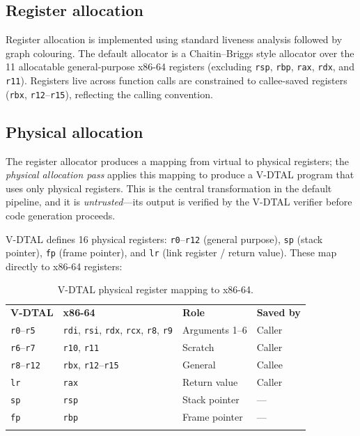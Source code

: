 \subsection{Register allocation}

Register allocation is implemented using standard liveness analysis followed by graph colouring. The default allocator is a Chaitin--Briggs style allocator over the 11 allocatable general-purpose x86-64 registers (excluding \texttt{rsp}, \texttt{rbp}, \texttt{rax}, \texttt{rdx}, and \texttt{r11}). Registers live across function calls are constrained to callee-saved registers (\texttt{rbx}, \texttt{r12}--\texttt{r15}), reflecting the calling convention. 

\subsection{Physical allocation}\label{sec:physalloc}

The register allocator produces a mapping from virtual to physical registers; the \textit{physical allocation pass} applies this mapping to produce a V-DTAL program that uses only physical registers. This is the central transformation in the default pipeline, and it is \textit{untrusted}---its output is verified by the V-DTAL verifier before code generation proceeds.

V-DTAL defines 16 physical registers: \texttt{r0}--\texttt{r12} (general purpose), \texttt{sp} (stack pointer), \texttt{fp} (frame pointer), and \texttt{lr} (link register / return value). These map directly to x86-64 registers:

\begin{table}[h]
\centering
\small
\begin{tabular}{l l l l}
\tablehline
\textbf{V-DTAL} & \textbf{x86-64} & \textbf{Role} & \textbf{Saved by} \\
\tablehline
\texttt{r0}--\texttt{r5} & \texttt{rdi}, \texttt{rsi}, \texttt{rdx}, \texttt{rcx}, \texttt{r8}, \texttt{r9} & Arguments 1--6 & Caller \\
\texttt{r6}--\texttt{r7} & \texttt{r10}, \texttt{r11} & Scratch & Caller \\
\texttt{r8}--\texttt{r12} & \texttt{rbx}, \texttt{r12}--\texttt{r15} & General & Callee \\
\texttt{lr} & \texttt{rax} & Return value & Caller \\
\texttt{sp} & \texttt{rsp} & Stack pointer & --- \\
\texttt{fp} & \texttt{rbp} & Frame pointer & --- \\
\tablehline
\end{tabular}
\caption{V-DTAL physical register mapping to x86-64.}
\label{tab:regmap}
\end{table}

